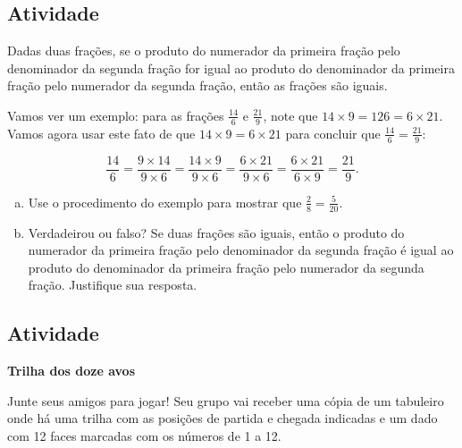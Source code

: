 \subsection{Atividade}

Dadas duas frações, se o produto do numerador da primeira fração pelo denominador da segunda fração for igual ao produto do denominador da primeira fração pelo numerador da segunda fração, então as frações são iguais. 

Vamos ver um exemplo: para as frações $\frac{14}{6}$ e $\frac{21}{9}$, note que  $14 \times 9 = 126 = 6 \times 21$. Vamos agora usar este fato de que $14 \times 9 = 6 \times 21$
para concluir que $\frac{14}{6} = \frac{21}{9}$:

$$\frac{14}{6} = \frac{9 \times 14}{9 \times 6} = \frac{14 \times 9}{9 \times 6} = \frac{6 \times 21}{9 \times 6} = \frac{6 \times 21}{6 \times 9} = \frac{21}{9}.$$

\begin{enumerate}[a)]
 \item Use o procedimento do exemplo para mostrar que $\frac{2}{8} = \frac{5}{20}$.
 \item Verdadeirou ou falso? Se duas frações são iguais, então o produto do numerador da primeira fração pelo denominador da segunda fração é igual ao produto do denominador da primeira fração pelo numerador da segunda fração. Justifique sua resposta.
\end{enumerate}

\subsection{Atividade}

{\bf Trilha dos doze avos}

Junte seus amigos para jogar! Seu grupo vai receber uma cópia de um tabuleiro onde há uma trilha com as posições de partida e chegada indicadas e um dado com 12 faces marcadas com os números de 1 a 12. 

